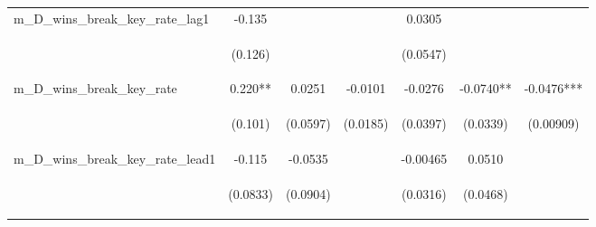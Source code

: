 \documentclass[]{article}
\begin{document}
\begin{center}
\begin{tabular}{lcccccc}
m\_D\_wins\_break\_key\_rate\_lag1 & -0.135 &  &  & 0.0305 &  &  \\
\vspace{4pt} & \begin{footnotesize}(0.126)\end{footnotesize} & \begin{footnotesize}\end{footnotesize} & \begin{footnotesize}\end{footnotesize} & \begin{footnotesize}(0.0547)\end{footnotesize} & \begin{footnotesize}\end{footnotesize} & \begin{footnotesize}\end{footnotesize} \\
m\_D\_wins\_break\_key\_rate & 0.220** & 0.0251 & -0.0101 & -0.0276 & -0.0740** & -0.0476*** \\
\vspace{4pt} & \begin{footnotesize}(0.101)\end{footnotesize} & \begin{footnotesize}(0.0597)\end{footnotesize} & \begin{footnotesize}(0.0185)\end{footnotesize} & \begin{footnotesize}(0.0397)\end{footnotesize} & \begin{footnotesize}(0.0339)\end{footnotesize} & \begin{footnotesize}(0.00909)\end{footnotesize} \\
m\_D\_wins\_break\_key\_rate\_lead1 & -0.115 & -0.0535 &  & -0.00465 & 0.0510 &  \\
\vspace{4pt} & \begin{footnotesize}(0.0833)\end{footnotesize} & \begin{footnotesize}(0.0904)\end{footnotesize} & \begin{footnotesize}\end{footnotesize} & \begin{footnotesize}(0.0316)\end{footnotesize} & \begin{footnotesize}(0.0468)\end{footnotesize} & \begin{footnotesize}\end{footnotesize} \\

\end{tabular}
\end{center}
\end{document}
